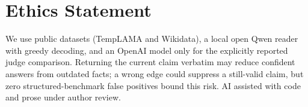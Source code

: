 \documentclass[letterpaper]{article}
\theoremstyle{plain}
\begin{document}
\section*{Ethics Statement}
We use public datasets (TempLAMA and Wikidata), a local open Qwen reader with greedy decoding, and an OpenAI model only for the explicitly reported judge comparison. Returning the current claim verbatim may reduce confident answers from outdated facts; a wrong edge could suppress a still-valid claim, but zero structured-benchmark false positives bound this risk. AI assisted with code and prose under author review.


\end{document}
